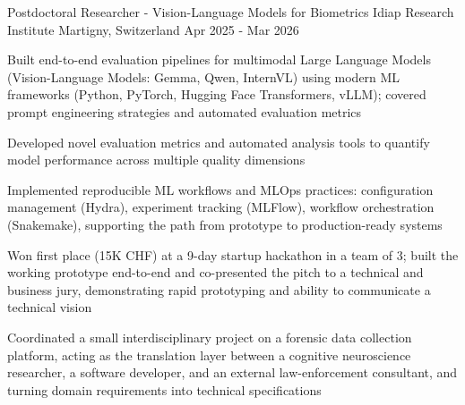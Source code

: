 

\begin{cventries}

\cventry
    {Postdoctoral Researcher - Vision-Language Models for Biometrics} %
    {Idiap Research Institute} %
    {Martigny, Switzerland} %
    {Apr 2025 - Mar 2026} %
    {
      \begin{cvitems} %
        \item {Built end-to-end evaluation pipelines for multimodal Large Language Models (Vision-Language Models: Gemma, Qwen, InternVL) using modern ML frameworks (Python, PyTorch, Hugging Face Transformers, vLLM); covered prompt engineering strategies and automated evaluation metrics}
        \item {Developed novel evaluation metrics and automated analysis tools to quantify model performance across multiple quality dimensions}
        \item {Implemented reproducible ML workflows and MLOps practices: configuration management (Hydra), experiment tracking (MLFlow), workflow orchestration (Snakemake), supporting the path from prototype to production-ready systems}
        \item {Won first place (15K CHF) at a 9-day startup hackathon in a team of 3; built the working prototype end-to-end and co-presented the pitch to a technical and business jury, demonstrating rapid prototyping and ability to communicate a technical vision}
        \item {Coordinated a small interdisciplinary project on a forensic data collection platform, acting as the translation layer between a cognitive neuroscience researcher, a software developer, and an external law-enforcement consultant, and turning domain requirements into technical specifications}
      \end{cvitems}
    }


\end{cventries}
